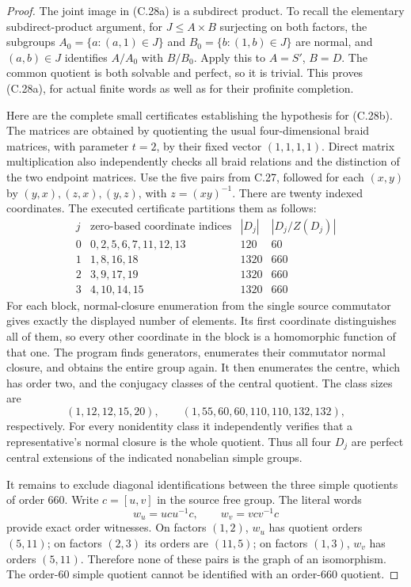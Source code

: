 \begin{proof}
The joint image in (C.28a) is a subdirect product.
To recall the elementary subdirect-product argument,
for \(J\leq A\times B\) surjecting on both factors,
the subgroups
\(A_0=\{a:(a,1)\in J\}\) and
\(B_0=\{b:(1,b)\in J\}\) are normal, and
\((a,b)\in J\) identifies \(A/A_0\) with
\(B/B_0\). Apply this to \(A=S'\), \(B=D\).
The common quotient is both solvable and perfect,
so it is trivial. This proves (C.28a), for actual
finite words as well as for their profinite completion.

Here are the complete small certificates establishing
the hypothesis for (C.28b). The matrices are obtained
by quotienting the usual four-dimensional braid
matrices, with parameter \(t=2\), by their fixed
vector \((1,1,1,1)\). Direct matrix multiplication
also independently checks all braid relations and
the distinction of the two endpoint matrices.
Use the five pairs from C.27, followed for each
\((x,y)\) by \((y,x),(z,x),(y,z)\), with
\(z=(xy)^{-1}\). There are twenty indexed coordinates.
The executed certificate partitions them as follows:
\[
\begin{array}{c|l|r|r}
 j&\text{zero-based coordinate indices}&|D_j|&|D_j/Z(D_j)|\\\hline
 0&0,2,5,6,7,11,12,13&120&60\\
 1&1,8,16,18&1320&660\\
 2&3,9,17,19&1320&660\\
 3&4,10,14,15&1320&660
\end{array}
\tag{C.28c}
\]
For each block, normal-closure enumeration from the
single source commutator gives exactly the displayed
number of elements. Its first coordinate distinguishes
all of them, so every other coordinate in the block
is a homomorphic function of that one. The program
finds generators, enumerates their commutator normal
closure, and obtains the entire group again.
It then enumerates the centre, which has order two,
and the conjugacy classes of the central quotient.
The class sizes are
\[
 (1,12,12,15,20),\qquad
 (1,55,60,60,110,110,132,132),
\]
respectively. For every nonidentity class it
independently verifies that a representative's normal
closure is the whole quotient. Thus all four
\(D_j\) are perfect central extensions of the indicated
nonabelian simple groups.

It remains to exclude diagonal identifications between
the three simple quotients of order 660. Write
\(c=[u,v]\) in the source free group. The literal words
\[
 w_u=ucu^{-1}c,\qquad w_v=vcv^{-1}c
\]
provide exact order witnesses. On factors \((1,2)\),
\(w_u\) has quotient orders \((5,11)\); on factors
\((2,3)\) its orders are \((11,5)\); on factors
\((1,3)\), \(w_v\) has orders \((5,11)\).
Therefore none of these pairs is the graph of an
isomorphism. The order-60 simple quotient cannot be
identified with an order-660 quotient.


\end{proof}

